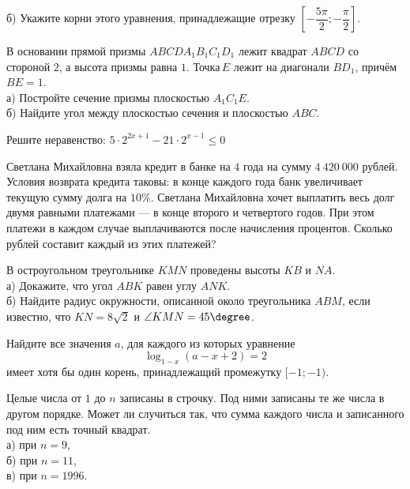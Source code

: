 \begin{training}[2]
\begin{listofex}
		б) Укажите корни этого уравнения, принадлежащие отрезку \( \left[ -\dfrac{5\pi}{2};-\dfrac{\pi}{2} \right]  \).
		\newpage
		\item В основании прямой призмы \( ABCDA_1B_1C_1D_1 \) лежит квадрат \( ABCD \) со стороной \( 2 \), а высота призмы равна \( 1 \). Точка \( E \) лежит на диагонали \( BD_1 \), причём \( BE=1 \).\\
		а)  Постройте сечение призмы плоскостью \( A_1C_1E \).\\		
		б)  Найдите угол между плоскостью сечения и плоскостью \( ABC \).
		\item Решите неравенство: \( 5\cdot2^{2x+1}-21\cdot2^{x-1}\le0 \)
		\item Светлана Михайловна взяла кредит в банке на \( 4 \) года на сумму \( 4\: 420\: 000 \) рублей. Условия возврата кредита таковы: в конце каждого года банк увеличивает текущую сумму долга на \( 10\% \). Светлана Михайловна хочет выплатить весь долг двумя равными платежами --- в конце второго и четвертого годов. При этом платежи в каждом случае выплачиваются после начисления процентов. Сколько рублей составит каждый из этих платежей?
		\item В остроугольном треугольнике \( KMN \) проведены высоты \( KB \) и \( NA \).\\
		а)  Докажите, что угол \( ABK \) равен углу \( ANK \).	\\
		б)  Найдите радиус окружности, описанной около треугольника \( ABM \), если известно, что \( KN=8\sqrt{2} \) и \( \angle KMN=45\degree \).
		\item Найдите все значения \( a \), для каждого из которых уравнение \[ \log_{1-x}(a-x+2)=2 \] имеет хотя бы один корень, принадлежащий промежутку \( [-1;-1) \).
		\item Целые числа от \( 1 \) до \( n \) записаны в строчку. Под ними записаны те же числа в другом порядке. Может ли случиться так, что сумма каждого числа и записанного под ним есть точный квадрат.\\
		а)  при \( n=9 \),\\		
		б)  при \( n=11 \),\\		
		в)  при \( n=1996 \).
	\end{listofex}
\end{training}
